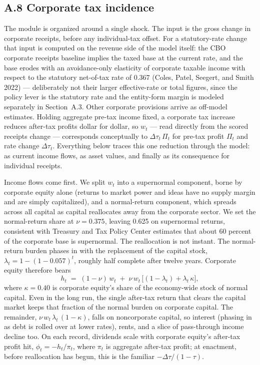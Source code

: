 \documentclass[10pt,twocolumn]{article}
\begin{document}
\subsection*{A.8 Corporate tax incidence}

The module is organized around a single shock. The input is the gross change
in corporate receipts, before any individual-tax offset. For a statutory-rate
change that input is computed on the revenue side of the model itself: the CBO
corporate receipts baseline implies the taxed base at the current rate, and
the base erodes with an avoidance-only elasticity of corporate taxable income
with respect to the statutory net-of-tax rate of 0.367 (Coles, Patel, Seegert,
and Smith 2022) --- deliberately not their larger effective-rate or total
figures, since the policy lever is the statutory rate and the entity-form
margin is modeled separately in Section~A.3. Other corporate provisions arrive
as off-model estimates. Holding aggregate
pre-tax income fixed, a corporate tax increase reduces after-tax profits
dollar for dollar, so $w_t$ --- read directly from the scored receipts
change --- corresponds conceptually to $\Delta\tau_t\,\Pi_t$ for pre-tax
profit $\Pi_t$ and rate change $\Delta\tau_t$. Everything below traces this one reduction
through the model: as current income flows, as asset values, and finally as
its consequence for individual receipts.

Income flows come first. We split $w_t$ into a supernormal
component, borne by corporate equity alone (returns to market power and ideas
have no supply margin and are simply capitalized), and a normal-return
component, which spreads across all capital as capital reallocates away from
the corporate sector. We set the normal-return share at $\nu = 0.375$, leaving
0.625 on supernormal returns, consistent with Treasury and Tax Policy Center
estimates that about 60 percent of the corporate base is supernormal. The
reallocation is not instant. The normal-return burden phases in with the
replacement of the capital stock, $\lambda_t = 1 - (1 - 0.057)^t$, roughly
half complete after twelve years. Corporate equity therefore bears
\begin{equation*}
h_t \;=\; (1-\nu)\,w_t \;+\; \nu\,w_t\,\big[(1-\lambda_t) + \lambda_t\,\kappa\big],
\end{equation*}
where $\kappa = 0.40$ is corporate equity's share of the economy-wide stock of
normal capital. Even in the long run, the single after-tax return that clears
the capital market keeps that fraction of the normal burden on corporate
capital. The remainder, $\nu\,w_t\,\lambda_t\,(1-\kappa)$, falls on
noncorporate capital, so interest (phasing in as debt is rolled over at lower
rates), rents, and a slice of pass-through income decline too. On each record,
dividends scale with corporate equity's after-tax profit hit,
$\phi_t = -h_t/\pi_t$, where $\pi_t$ is aggregate after-tax profit; at enactment,
before reallocation has begun, this is the familiar
$-\Delta\tau/(1-\tau)$.
\end{document}
